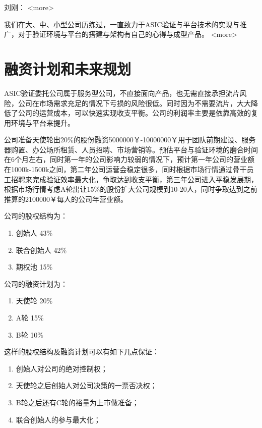 \documentclass[a4paper,11pt]{article}
\begin{document}
刘刚：
<more>

我们在大、中、小型公司历练过，一直致力于ASIC验证与平台技术的实现与推广，对于验证环境与平台的搭建与架构有自己的心得与成型产品。
<more>
\pagebreak

\section{融资计划和未来规划}
ASIC验证委托公司属于服务型公司，不直接面向产品，也无需直接承担流片风险，公司在市场需求充足的情况下亏损的风险很低。同时因为不需要流片，大大降低了公司的运营成本，可以快速实现收支平衡。公司的利润率主要是依靠高效的复用环境与平台来提升。

公司准备天使轮出20\%的股份融资5000000￥-10000000￥用于团队前期建设、服务器购置、办公场所租赁、人员招聘、市场营销等。预估平台与验证环境的磨合时间在6个月左右，同时第一年的公司影响力较弱的情况下，预计第一年公司的营业额在1000k-1500k之间，第二年公司运营会稳定很多，同时根据市场行情通过骨干员工招聘来完成验证效率最大化，争取达到收支平衡，第三年公司进入平稳发展期，根据市场行情考虑A轮出让15\%的股份扩大公司规模到10-20人，同时争取达到之前推算的2100000￥每人的公司年营业额。

公司的股权结构为：
\begin{enumerate}
\item 创始人 43\%
\item 联合创始人 42\%
\item 期权池 15\%
\end{enumerate}

公司的融资计划为：
\begin{enumerate}
\item 天使轮 20\%
\item A轮 15\%
\item B轮 10\%
\end{enumerate}

这样的股权结构及融资计划可以有如下几点保证：
\begin{enumerate}
\item 创始人对公司的绝对控制权；
\item 天使轮之后创始人对公司决策的一票否决权；
\item B轮之后还有C轮的裕量为上市做准备；
\item 联合创始人的参与最大化；
\end{enumerate}
\pagebreak



\end{document}
